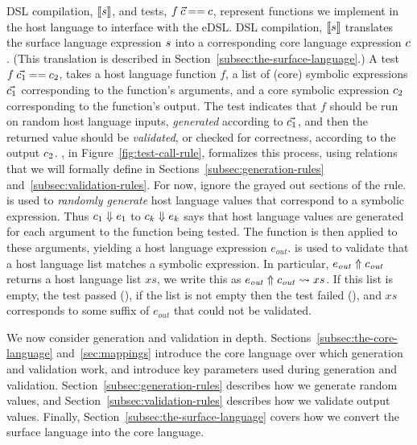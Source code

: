 DSL compilation, $\llbracket s \rrbracket$,
and tests, $f\>\vec{c} \>\mathit{==}\> c$,
represent functions we implement in the host language to interface with the eDSL.
DSL compilation, $\llbracket s \rrbracket$ translates the surface language expression
$s$ into a corresponding core language expression $c$.
(This translation is described in Section~\ref{subsec:the-surface-language}.)
A test $f\>\vec{c_1} \>\mathit{==}\> c_2$,
takes a host language function $f$,
a list of (core) symbolic expressions $\vec{c_1}$ corresponding to
the function's arguments,
and a core symbolic expression $c_2$ corresponding to the function's output.
The test indicates that $f$ should be run on random host language inputs,
\textit{generated} according to $\vec{c_1}$,
and then the returned value should be \textit{validated}, or checked for correctness,
according to the output $c_2$.
, in Figure~\ref{fig:test-call-rule},
formalizes this process,
using relations that we will formally define in Sections~\ref{subsec:generation-rules} and~\ref{subsec:validation-rules}.
For now,
ignore the grayed out sections of the rule.
\gens is used to \textit{randomly generate}
host language values that correspond to a symbolic expression. 
Thus $c_1 \Downarrow e_1$ to $c_k \Downarrow e_k$
says that
host language values are generated for each argument to the function being tested.
The function is then applied to these arguments,
yielding a host language expression $e_\mathit{out}$.
\gennedby is used to validate that
a host language list matches a symbolic expression.
In particular,
$e_{\mathit{out}} \Uparrow c_{\mathit{out}}$
returns a host language list $xs$,
we write this as
$e_{\mathit{out}} \Uparrow c_{\mathit{out}} \leadsto xs$.
If this list is empty,
the test passed (\testpasses),
if the list is not empty then the test failed (\testfails),
and
$xs$ corresponds to some suffix of $e_{\mathit{out}}$ that could not be validated.

We now consider generation and validation in depth.
Sections~\ref{subsec:the-core-language} and~\ref{sec:mappings}
introduce the core language over which generation and validation work,
and introduce key parameters used during generation and validation.
Section~\ref{subsec:generation-rules}
describes how we generate random values,
and Section~\ref{subsec:validation-rules}
describes how we validate output values.
Finally, Section~\ref{subsec:the-surface-language}
covers how we convert the surface language into the core language.